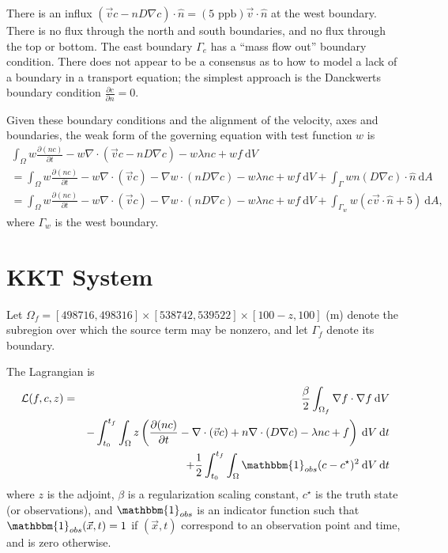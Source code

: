 \documentclass[12pt, letterpaper]{article}
\newcommand{\dA}{{\:\textrm{d}A}}
\newcommand{\dV}{{\:\textrm{d}V}}
\newcommand{\dt}{{\:\textrm{d}t}}
\begin{document}
There is an influx $(\vec{v}c-nD\nabla c)\cdot\hat{n}=(5\textrm{ ppb})\vec{v}\cdot\hat{n}$ at the west boundary. There is no flux through the north and south boundaries, and no flux through the top or bottom. The east boundary $\Gamma_e$ has a ``mass flow out'' boundary condition. There does not appear to be a consensus as to how to model a lack of a boundary in a transport equation; the simplest approach is the Danckwerts boundary condition $\frac{\partial c}{\partial n}=0$. 

Given these boundary conditions and the alignment of the velocity, axes and boundaries, the weak form of the governing equation with test function $w$ is
\begin{multline*}
\int_\Omega w\frac{\partial (nc)}{\partial t} - w\nabla\cdot(\vec{v}c - nD\nabla c) - w\lambda nc + wf \dV \\
= \int_\Omega w\frac{\partial (nc)}{\partial t} - w\nabla\cdot(\vec{v}c) - \nabla w\cdot (nD\nabla c) - w\lambda nc + wf \dV + \int_\Gamma wn(D\nabla c)\cdot\hat{n} \dA\\
= \int_\Omega w\frac{\partial (nc)}{\partial t} - w\nabla\cdot(\vec{v}c) - \nabla w\cdot (nD\nabla c) - w\lambda nc + wf \dV + \int_{\Gamma_w} w(c\vec{v}\cdot\hat{n}+5) \dA,
\end{multline*}
where $\Gamma_w$ is the west boundary.

\section{KKT System}

Let $\Omega_f=[498716,498316]\times[538742,539522]\times[100-z,100]$ (m) denote the subregion over which the source term may be nonzero, and let $\Gamma_f$ denote its boundary.

The Lagrangian is
\begin{eqnarray*}
\mathcal{L}(f,c,z) &=& \frac{\beta}{2}\int_{\Omega_f}\nabla f\cdot\nabla f\dV \\
&& -\int_{t_0}^{t_f}\int_\Omega z\left(\frac{\partial (nc)}{\partial t}-\nabla\cdot(\vec{v}c)+n\nabla\cdot (D\nabla c)-\lambda n c + f\right)\dV\dt \\
&& +\frac{1}{2}\int_{t_0}^{t_f}\int_\Omega \mathbbm{1}_{obs}(c-c^\star)^2 \dV\dt
\end{eqnarray*}
where $z$ is the adjoint, $\beta$ is a regularization scaling constant, $c^\star$ is the truth state (or observations), and $\mathbbm{1}_{obs}$ is an indicator function such that $\mathbbm{1}_{obs}(\vec{x},t)=1$ if $(\vec{x},t)$ correspond to an observation point and time, and is zero otherwise.
\end{document}
